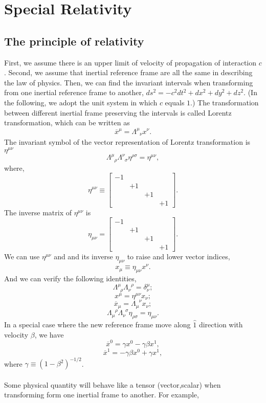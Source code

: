 \chapter{Special Relativity}
\section{The principle of relativity}
First, we assume there is an upper limit of velocity of propagation of interaction $c$. Second, we assume that inertial reference frame are all the same in describing the law of physics. Then, we can find the invariant intervals when transforming from one inertial reference frame to another, $ds^2 = -c^2 dt^2 + dx^2 + dy^2 + dz^2$. 
(In the following, we adopt the unit system in which $c$ equals $1$.) The transformation between different inertial frame preserving the intervals is called Lorentz transformation, which can be written as
\[\overline{x}^{\mu} = \Lambda^{\mu}_{\phantom{\mu}\nu} x^{\nu}.\]
The invariant symbol of the vector representation of Lorentz transformation is $\eta^{\mu \nu}$
\[\Lambda^{\mu}_{\phantom{\mu}\rho}  \Lambda^{\nu}_{\phantom{\nu}\sigma}  \eta^{\rho \sigma} = \eta^{\mu \nu},\]
where,
\[\eta^{\mu \nu} \equiv \left[ 
\begin{matrix} 
-1& & & \\ 
& +1 & & \\
& & +1 & \\
& & & +1
\end{matrix} 
\right].\]
The inverse matrix of $\eta^{\mu \nu}$ is
\[\eta_{\mu \nu} = \left[ 
\begin{matrix} 
-1& & & \\ 
& +1 & & \\
& & +1 & \\
& & & +1
\end{matrix} 
\right].\]
We can use $\eta^{\mu \nu}$ and and its inverse $\eta_{\mu \nu}$ to raise and lower vector indices, 
\[x_{\mu} \equiv \eta_{\mu \nu} x^{\nu}.\]
And we can verify the following identities,
\[\Lambda^{\mu}_{\phantom{\rho}\rho} \Lambda_{\nu}^{\phantom{\rho}\rho} = \delta^{\mu}_{\nu};\]
\[x^{\mu} = \eta^{\mu \nu} x_{\nu};\]
\[\overline{x}_{\mu} = \Lambda_{\mu}^{\phantom{\mu}\nu} x_{\nu};\]
\[\Lambda_{\mu}^{\phantom{\mu}\rho} \Lambda_{\nu} ^{\phantom{\nu}\sigma}  \eta_{\rho \sigma} = \eta_{\mu \nu}.\]
In a special case where the new reference frame move along $\hat{1}$ direction with velocity $\beta$, we have
\[\overline{x}^{0} = \gamma x^0 - \gamma \beta x^1,\]
\[\overline{x}^{1} = -\gamma \beta x^0 + \gamma x^1,\]
where $\gamma \equiv (1-\beta^2)^{-1/2}$.
\\ \\
Some physical quantity will behave like a tensor (vector,scalar) when transforming form one inertial frame to another. For example,
